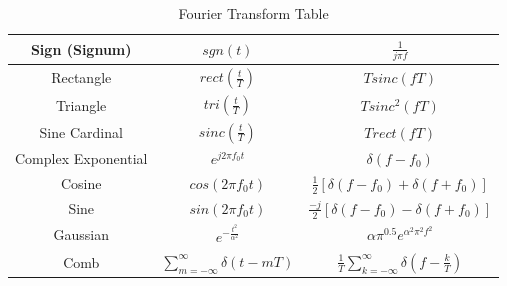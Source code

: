 \documentclass{article}
\begin{document}
\begin{enumerate}
\begin{table}[h]
\begin{tabular}{|c|c|c|}
        \hline
        Sign (Signum) & $sgn(t)$ & $\displaystyle \frac{1}{j\pi f}$ \\
        \hline
        Rectangle & $rect(\frac{t}{T})$ & $Tsinc(fT)$ \\
        \hline
        Triangle & $tri(\frac{t}{T})$ & $Tsinc^2(fT)$ \\
        \hline
        Sine Cardinal & $sinc(\frac{t}{T})$ & $Trect(fT)$ \\
        \hline
        Complex Exponential & $e^{j2\pi f_0 t}$ & $\delta(f-f_0)$ \\
        \hline
        Cosine & $cos(2\pi f_0t)$ & $\displaystyle \frac{1}{2}[\delta(f-f_0)+\delta(f+f_0)]$\\
        \hline
        Sine & $sin(2\pi f_0t)$ & $\displaystyle \frac{-j}{2}[\delta(f-f_0)-\delta(f+f_0)]$\\
        \hline
        Gaussian & $\displaystyle e^{-\frac{t^2}{\alpha^2}}$ & $\displaystyle \alpha \pi^{0.5}e^{\alpha^2\pi^2f^2}$ \\
        \hline
        Comb & $\displaystyle \sum^{\infty}_{m=-\infty}\delta(t-mT)$ & $\displaystyle \frac{1}{T}\sum^{\infty}_{k=-\infty}\delta(f-\frac{k}{T})$\\
        \hline
        \end{tabular}
        \caption{Fourier Transform Table}
        \label{tab:my_label}
    \end{table}
\end{enumerate}
\end{document}

